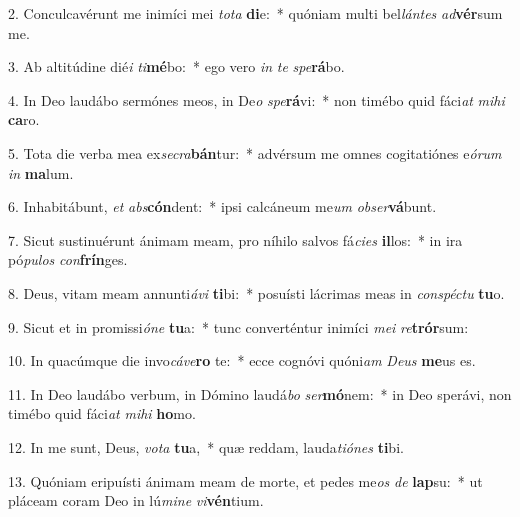 2. Conculcavérunt me inimíci mei \textit{to}\textit{ta} \textbf{di}e:~*  quóniam multi bel\textit{lán}\textit{tes} \textit{ad}\textbf{vér}sum me.\

3. Ab altitúdine dié\textit{i} \textit{ti}\textbf{mé}bo:~*  ego vero \textit{in} \textit{te} \textit{spe}\textbf{rá}bo.\

4. In Deo laudábo sermónes meos, in De\textit{o} \textit{spe}\textbf{rá}vi:~*  non timébo quid fáci\textit{at} \textit{mi}\textit{hi} \textbf{ca}ro.\

5. Tota die verba mea ex\textit{se}\textit{cra}\textbf{bán}tur:~*  advérsum me omnes cogitatiónes e\textit{ó}\textit{rum} \textit{in} \textbf{ma}lum.\

6. Inhabitábunt, \textit{et} \textit{abs}\textbf{cón}dent:~*  ipsi calcáneum me\textit{um} \textit{ob}\textit{ser}\textbf{vá}bunt.\

7. Sicut sustinuérunt ánimam meam, pro níhilo salvos fá\textit{ci}\textit{es} \textbf{il}los:~*  in ira pó\textit{pu}\textit{los} \textit{con}\textbf{frín}ges.\

8. Deus, vitam meam annunti\textit{á}\textit{vi} \textbf{ti}bi:~*  posuísti lácrimas meas in \textit{con}\textit{spéc}\textit{tu} \textbf{tu}o.\

9. Sicut et in promissi\textit{ó}\textit{ne} \textbf{tu}a:~*  tunc converténtur inimíci \textit{me}\textit{i} \textit{re}\textbf{trór}sum:\

10. In quacúmque die invo\textit{cá}\textit{ve}\textbf{ro} te:~*  ecce cognóvi quóni\textit{am} \textit{De}\textit{us} \textbf{me}us es.\

11. In Deo laudábo verbum, in Dómino laudá\textit{bo} \textit{ser}\textbf{mó}nem:~*  in Deo sperávi, non timébo quid fáci\textit{at} \textit{mi}\textit{hi} \textbf{ho}mo.\

12. In me sunt, Deus, \textit{vo}\textit{ta} \textbf{tu}a,~*  quæ reddam, lauda\textit{ti}\textit{ó}\textit{nes} \textbf{ti}bi.\

13. Quóniam eripuísti ánimam meam de morte, et pedes me\textit{os} \textit{de} \textbf{lap}su:~*  ut pláceam coram Deo in lú\textit{mi}\textit{ne} \textit{vi}\textbf{vén}tium.\

